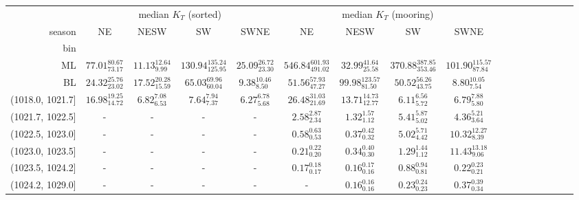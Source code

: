 \begin{tabular}{@{\extracolsep\fill}rcccccccccccccccc}
\toprule
{} & \multicolumn{4}{c}{median $K_T$ (sorted)} & \multicolumn{4}{c}{median $K_T$ (mooring)} \\
season &                       NE &                     NESW &                          SW &                     SWNE &                          NE &                      NESW &                          SW &                       SWNE \\
bin              &                          &                          &                             &                          &                             &                           &                             &                            \\
\midrule
ML               &  $77.01_{73.17}^{80.67}$ &   $11.13_{9.99}^{12.64}$ &  $130.94_{125.95}^{135.24}$ &  $25.09_{23.30}^{26.72}$ &  $546.84_{491.02}^{601.93}$ &   $32.99_{25.58}^{41.64}$ &  $370.88_{353.46}^{387.85}$ &  $101.90_{87.84}^{115.57}$ \\
BL               &  $24.32_{23.02}^{25.76}$ &  $17.52_{15.59}^{20.28}$ &     $65.03_{60.04}^{69.96}$ &    $9.38_{8.50}^{10.46}$ &     $51.56_{47.27}^{57.93}$ &  $99.98_{81.50}^{123.57}$ &     $50.52_{43.75}^{56.26}$ &      $8.80_{7.54}^{10.05}$ \\
(1018.0, 1021.7] &  $16.98_{14.72}^{19.25}$ &     $6.82_{6.53}^{7.08}$ &        $7.64_{7.37}^{7.94}$ &     $6.27_{5.68}^{6.78}$ &     $26.48_{21.69}^{31.03}$ &   $13.71_{12.77}^{14.73}$ &        $6.11_{5.72}^{6.56}$ &       $6.79_{5.80}^{7.88}$ \\
(1021.7, 1022.5] &                        - &                        - &                           - &                        - &        $2.58_{2.34}^{2.87}$ &      $1.32_{1.12}^{1.57}$ &        $5.41_{5.02}^{5.87}$ &       $4.36_{3.64}^{5.21}$ \\
(1022.5, 1023.0] &                        - &                        - &                           - &                        - &        $0.58_{0.53}^{0.63}$ &      $0.37_{0.32}^{0.42}$ &        $5.02_{4.42}^{5.71}$ &     $10.32_{8.39}^{12.27}$ \\
(1023.0, 1023.5] &                        - &                        - &                           - &                        - &        $0.21_{0.20}^{0.22}$ &      $0.34_{0.30}^{0.40}$ &        $1.29_{1.12}^{1.44}$ &     $11.43_{9.06}^{13.18}$ \\
(1023.5, 1024.2] &                        - &                        - &                           - &                        - &        $0.17_{0.17}^{0.18}$ &      $0.16_{0.16}^{0.17}$ &        $0.88_{0.81}^{0.94}$ &       $0.22_{0.21}^{0.23}$ \\
(1024.2, 1029.0] &                        - &                        - &                           - &                        - &        - &      $0.16_{0.16}^{0.16}$ &        $0.23_{0.23}^{0.24}$ &       $0.37_{0.34}^{0.39}$ \\
\bottomrule
\end{tabular}

